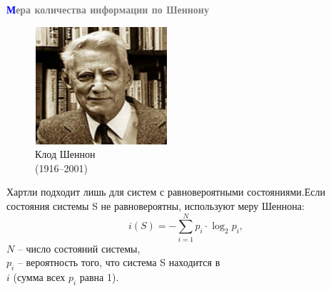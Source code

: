 \begin{frame}{\hspace{4cm}\textbf{\textcolor{blue}{М}\textcolor{gray}{ера количества информации по Шеннону}}}
    
    \begin{figure}
        \includegraphics[width = 0.9\linewidth]{Slide18.png}
        \caption*{Клод Шеннон\\(1916--2001)}
    \end{figure}
    
    \fontsize{9pt}{11pt}\selectfont
    \setlength{\parindent}{3ex}
     Хартли подходит лишь для систем с равновероятными состояниями.Если состояния системы S не равновероятны, используют меру Шеннона:
    \begin{equation*}
        i(S) = -\sum_{i = 1}^{N} p_i \cdot \log_2 p_i,
    \end{equation*}
     $N$ – число состояний системы,\\
    \noindent$p_i$ – вероятность того, что система S находится в\\
     $i$ (сумма всех $p_i$ равна 1).
    

\end{frame}

